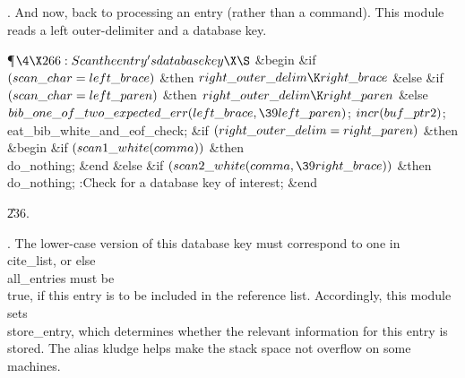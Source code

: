 .
And now, back to processing an entry (rather than a command).  This
module reads a left outer-delimiter and a database key.

\Y\P$\4\X266:Scan the entry's database key\X\S$\6
\&{begin} \&{if} $(\\{scan\_char}=\\{left\_brace})$ \1\&{then}\5
$\\{right\_outer\_delim}\K\\{right\_brace}$\6
\4\&{else} \&{if} $(\\{scan\_char}=\\{left\_paren})$ \1\&{then}\5
$\\{right\_outer\_delim}\K\\{right\_paren}$\6
\4\&{else} $\\{bib\_one\_of\_two\_expected\_err}(\\{left\_brace},\39\\{left%
\_paren})$;\2\2\6
$\\{incr}(\\{buf\_ptr2})$;\6
\\{eat\_bib\_white\_and\_eof\_check};\6
\&{if} $(\\{right\_outer\_delim}=\\{right\_paren})$ \1\&{then}\6
\&{begin} \&{if} $(\\{scan1\_white}(\\{comma}))$ \1\&{then}\6
\\{do\_nothing};\2\6
\&{end}\6
\4\&{else} \&{if} $(\\{scan2\_white}(\\{comma},\39\\{right\_brace}))$ \1%
\&{then}\6
\\{do\_nothing};\2\2\6
:Check for a database key of interest\X;\6
\&{end}\par
\U236.\fi

.
The lower-case version of this database key must correspond to one in
\\{cite\_list}, or else \\{all\_entries} must be \\{true}, if this entry is to
be included in the reference list.  Accordingly, this module sets
\\{store\_entry}, which determines whether the relevant information for
this entry is stored.  The alias kludge helps make the stack space not
overflow on some machines.

